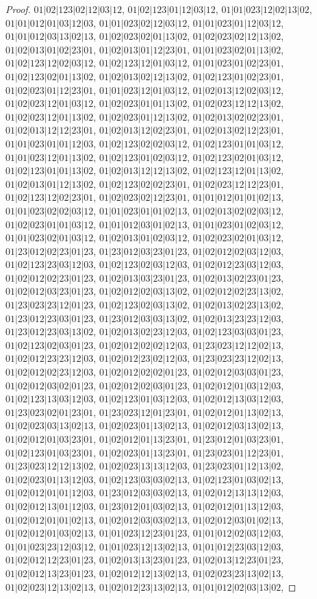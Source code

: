 \documentclass[12pt]{article}
\theoremstyle{plain}
\theoremstyle{definition}
\theoremstyle{remark}
\begin{document}
\begin{proof}
$01|02|123|02|12|03|12$, $01|02|123|01|12|03|12$, $01|01|023|12|02|13|02$, $01|01|012|01|03|12|03$, $01|01|023|02|12|03|12$, $01|01|023|01|12|03|12$, $01|01|012|03|13|02|13$, $01|02|023|02|01|13|02$, $01|02|023|02|12|13|02$, $01|02|013|01|02|23|01$, $01|02|013|01|12|23|01$, $01|01|023|02|01|13|02$, $01|02|123|12|02|03|12$, $01|02|123|12|01|03|12$, $01|01|023|01|02|23|01$, $01|02|123|02|01|13|02$, $01|02|013|02|12|13|02$, $01|02|123|01|02|23|01$, $01|02|023|01|12|23|01$, $01|01|023|12|01|03|12$, $01|02|013|12|02|03|12$, $01|02|023|12|01|03|12$, $01|02|023|01|01|13|02$, $01|02|023|12|12|13|02$, $01|02|023|12|01|13|02$, $01|02|023|01|12|13|02$, $01|02|013|02|02|23|01$, $01|02|013|12|12|23|01$, $01|02|013|12|02|23|01$, $01|02|013|02|12|23|01$, $01|01|023|01|01|12|03$, $01|02|123|02|02|03|12$, $01|02|123|01|01|03|12$, $01|01|023|12|01|13|02$, $01|02|123|01|02|03|12$, $01|02|123|02|01|03|12$, $01|02|123|01|01|13|02$, $01|02|013|12|12|13|02$, $01|02|123|12|01|13|02$, $01|02|013|01|12|13|02$, $01|02|123|02|02|23|01$, $01|02|023|12|12|23|01$, $01|02|123|12|02|23|01$, $01|02|023|02|12|23|01$, $01|01|012|01|01|02|13$, $01|01|023|02|02|03|12$, $01|01|023|01|01|02|13$, $01|02|013|02|02|03|12$, $01|02|023|01|01|03|12$, $01|01|012|03|01|02|13$, $01|01|023|01|02|03|12$, $01|01|023|02|01|03|12$, $01|02|013|01|02|03|12$, $01|02|023|02|01|03|12$, $01|23|012|02|23|01|23$, $01|23|012|03|23|01|23$, $01|02|012|02|03|12|03$, $01|02|123|23|03|12|03$, $01|02|123|02|03|12|03$, $01|02|012|23|03|12|03$, $01|02|012|02|23|01|23$, $01|02|013|03|23|01|23$, $01|02|013|02|23|01|23$, $01|02|012|03|23|01|23$, $01|02|012|02|03|13|02$, $01|02|012|02|23|13|02$, $01|23|023|23|12|01|23$, $01|02|123|02|03|13|02$, $01|02|013|02|23|13|02$, $01|23|012|23|03|01|23$, $01|23|012|03|03|13|02$, $01|02|013|23|23|12|03$, $01|23|012|23|03|13|02$, $01|02|013|02|23|12|03$, $01|02|123|03|03|01|23$, $01|02|123|02|03|01|23$, $01|02|012|02|02|12|03$, $01|23|023|12|12|02|13$, $01|02|012|23|23|12|03$, $01|02|012|23|02|12|03$, $01|23|023|23|12|02|13$, $01|02|012|02|23|12|03$, $01|02|012|02|02|01|23$, $01|02|012|03|03|01|23$, $01|02|012|03|02|01|23$, $01|02|012|02|03|01|23$, $01|02|012|01|03|12|03$, $01|02|123|13|03|12|03$, $01|02|123|01|03|12|03$, $01|02|012|13|03|12|03$, $01|23|023|02|01|23|01$, $01|23|023|12|01|23|01$, $01|02|012|01|13|02|13$, $01|02|023|03|13|02|13$, $01|02|023|01|13|02|13$, $01|02|012|03|13|02|13$, $01|02|012|01|03|23|01$, $01|02|012|01|13|23|01$, $01|23|012|01|03|23|01$, $01|02|123|01|03|23|01$, $01|02|023|01|13|23|01$, $01|23|023|01|12|23|01$, $01|23|023|12|12|13|02$, $01|02|023|13|13|12|03$, $01|23|023|01|12|13|02$, $01|02|023|01|13|12|03$, $01|02|123|03|03|02|13$, $01|02|123|01|03|02|13$, $01|02|012|01|01|12|03$, $01|23|012|03|03|02|13$, $01|02|012|13|13|12|03$, $01|02|012|13|01|12|03$, $01|23|012|01|03|02|13$, $01|02|012|01|13|12|03$, $01|02|012|01|01|02|13$, $01|02|012|03|03|02|13$, $01|02|012|03|01|02|13$, $01|02|012|01|03|02|13$, $01|01|023|12|23|01|23$, $01|01|012|02|03|12|03$, $01|01|023|23|12|03|12$, $01|01|023|12|13|02|13$, $01|01|012|23|03|12|03$, $01|02|012|12|23|01|23$, $01|02|013|13|23|01|23$, $01|02|013|12|23|01|23$, $01|02|012|13|23|01|23$, $01|02|012|12|13|02|13$, $01|02|023|23|13|02|13$, $01|02|023|12|13|02|13$, $01|02|012|23|13|02|13$, $01|01|012|02|03|13|02$, 
\end{proof}
\end{document}
